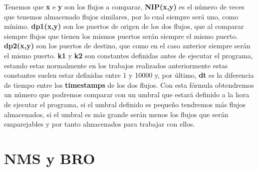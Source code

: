 \noindent Tenemos que \textbf{x} e \textbf{y} son los flujos a comparar, \textbf{NIP(x,y)} es el número 
de veces que tenemos almacenado flujos similares, por lo cual siempre 
será uno, como mínimo. \textbf{dp1(x,y)} son los puertos de origen de los dos 
flujos, que al comparar siempre flujos que tienen los mismos puertos serán siempre el mismo puerto.
\textbf{dp2(x,y)} son los puertos de destino, que como en el caso anterior siempre serán el mismo puerto.
\textbf{k1} y \textbf{k2} son constantes definidas antes de ejecutar el programa, 
estando estas normalmente en los trabajos realizados anteriormente estas constantes suelen estar 
definidas entre 1 y 10000 y, por último, \textbf{dt} es la diferencia de tiempo entre 
los \textbf{timestamps} de los dos flujos.
\intro
Con esta fórmula obtendremos un número que podremos comparar con un 
umbral que estará definido a la hora de ejecutar el programa, si el umbral 
definido es pequeño tendremos más flujos almacenados, si el umbral es más grande serán 
menos los flujos que serán emparejables y por tanto almacenados para trabajar con ellos. \cite{comparacion}




\section{NMS y BRO}

